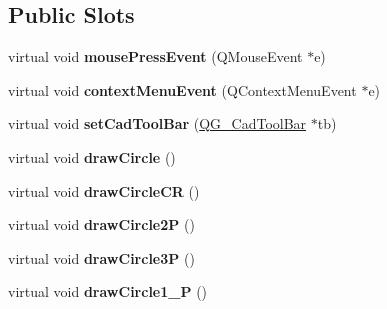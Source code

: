 \subsection*{Public Slots}
\begin{DoxyCompactItemize}
\item 
\hypertarget{classQG__CadToolBarCircles_ac8d728c1041badf91716bd7338425531}{virtual void {\bfseries mouse\-Press\-Event} (Q\-Mouse\-Event $\ast$e)}\label{classQG__CadToolBarCircles_ac8d728c1041badf91716bd7338425531}

\item 
\hypertarget{classQG__CadToolBarCircles_a5d6721eb228a36aa59e72b251c5f927d}{virtual void {\bfseries context\-Menu\-Event} (Q\-Context\-Menu\-Event $\ast$e)}\label{classQG__CadToolBarCircles_a5d6721eb228a36aa59e72b251c5f927d}

\item 
\hypertarget{classQG__CadToolBarCircles_ab6f48d02d0a7ddeebc7a55b6ebf4ee51}{virtual void {\bfseries set\-Cad\-Tool\-Bar} (\hyperlink{classQG__CadToolBar}{Q\-G\-\_\-\-Cad\-Tool\-Bar} $\ast$tb)}\label{classQG__CadToolBarCircles_ab6f48d02d0a7ddeebc7a55b6ebf4ee51}

\item 
\hypertarget{classQG__CadToolBarCircles_abdf2dc1edac5cff4a78c6918ff531195}{virtual void {\bfseries draw\-Circle} ()}\label{classQG__CadToolBarCircles_abdf2dc1edac5cff4a78c6918ff531195}

\item 
\hypertarget{classQG__CadToolBarCircles_ac071532e55952627905289779b7ac80a}{virtual void {\bfseries draw\-Circle\-C\-R} ()}\label{classQG__CadToolBarCircles_ac071532e55952627905289779b7ac80a}

\item 
\hypertarget{classQG__CadToolBarCircles_accc8d986b242fdc9daacaeb0c7ab5744}{virtual void {\bfseries draw\-Circle2\-P} ()}\label{classQG__CadToolBarCircles_accc8d986b242fdc9daacaeb0c7ab5744}

\item 
\hypertarget{classQG__CadToolBarCircles_a25fae18702e7d7d46ab8ec5c2e423f9b}{virtual void {\bfseries draw\-Circle3\-P} ()}\label{classQG__CadToolBarCircles_a25fae18702e7d7d46ab8ec5c2e423f9b}

\item 
\hypertarget{classQG__CadToolBarCircles_a671e4a76e2398a307e538ca84b99baf3}{virtual void {\bfseries draw\-Circle1\-\_\-P} ()}\label{classQG__CadToolBarCircles_a671e4a76e2398a307e538ca84b99baf3}


\end{DoxyCompactItemize}

